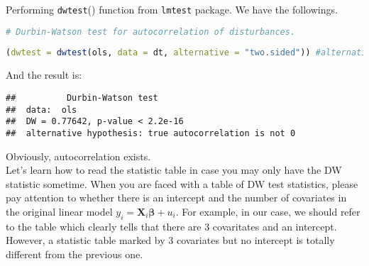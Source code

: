 \documentclass{article}
\theoremstyle{definition}
\begin{document}
Performing \texttt{dwtest}() function from \texttt{lmtest} package. We have the followings.\\

\begin{lstlisting}[language=R]
# Durbin-Watson test for autocorrelation of disturbances.
	
(dwtest = dwtest(ols, data = dt, alternative = "two.sided")) #alternative = c("greater", "two.sided", "less")
\end{lstlisting}
 
And the result is:\\

\begin{verbatim}
## 			Durbin-Watson test
##	data:  ols
## 	DW = 0.77642, p-value < 2.2e-16
##  alternative hypothesis: true autocorrelation is not 0
\end{verbatim}

Obviously, autocorrelation exists.\\

Let's learn how to read the statistic table in case you may only have the DW statistic sometime. When you are faced with a table of DW test statistics, please pay attention to whether there is an intercept and the number of covariates in the original linear model $y_i = \bm{X}_i \bm{\beta} + u_i$. For example, in our case, we should refer to the table which clearly tells that there are 3 covaritates and an intercept. However, a statistic table marked by 3 covariates but no intercept is totally different from the previous one.\\
\end{document}
